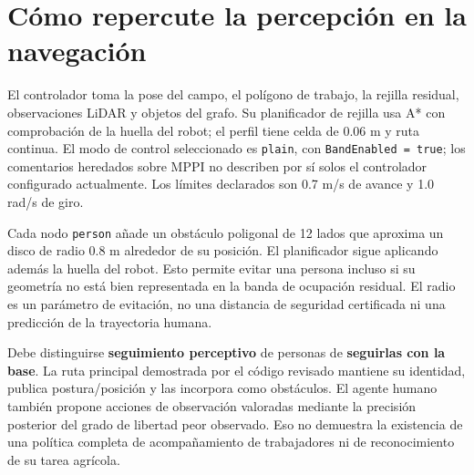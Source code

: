 \documentclass[11pt,a4paper]{article}
\newcommand{\code}[1]{\nolinkurl{#1}}
\begin{document}
\section{Cómo repercute la percepción en la navegación}
El controlador toma la pose del campo, el polígono de trabajo, la rejilla residual,
observaciones LiDAR y objetos del grafo. Su planificador de rejilla usa A* con
comprobación de la huella del robot; el perfil tiene celda de 0.06 m y ruta continua.
El modo de control seleccionado es \code{plain}, con \code{BandEnabled = true};
los comentarios heredados sobre MPPI no describen por sí solos el controlador
configurado actualmente. Los límites declarados son 0.7 m/s de avance y 1.0 rad/s
de giro.~\cite{controllerconfig,planner,trajectory}

Cada nodo \code{person} añade un obstáculo poligonal de 12 lados que aproxima un
disco de radio 0.8 m alrededor de su posición. El planificador sigue aplicando además
la huella del robot. Esto permite evitar una persona incluso si su geometría no
está bien representada en la banda de ocupación residual. El radio es un parámetro
de evitación, no una distancia de seguridad certificada ni una predicción de la
trayectoria humana.~\cite{obstacletracker,controllerconfig}

Debe distinguirse \textbf{seguimiento perceptivo} de personas de \textbf{seguirlas
con la base}. La ruta principal demostrada por el código revisado mantiene su
identidad, publica postura/posición y las incorpora como obstáculos. El agente
humano también propone acciones de observación valoradas mediante la precisión
posterior del grado de libertad peor observado. Eso no demuestra la existencia de una política completa
de acompañamiento de trabajadores ni de reconocimiento de su tarea agrícola.
\cite{humanworker,epistemic,readme}
\end{document}
